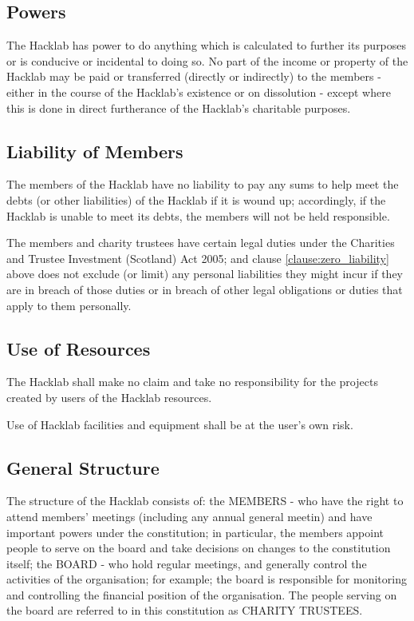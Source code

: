 \documentclass{article}
\newcommand{\charityact}{Charities and Trustee Investment (Scotland) Act 2005}
\begin{document}
\subsection{Powers}
\clause The Hacklab has power to do anything which is calculated to
further its purposes or is conducive or incidental to doing so.
\clause No part of the income or property of the Hacklab may be paid
or transferred (directly or indirectly) to the members - either in the
course of the Hacklab's existence or on dissolution - except where
this is done in direct furtherance of the Hacklab's charitable
purposes.
\subsection{Liability of Members}
\clause\label{clause:zero_liability} The members of the Hacklab have
no liability to pay any sums to help meet the debts (or other
liabilities) of the Hacklab if it is wound up; accordingly, if the
Hacklab is unable to meet its debts, the members will not be held
responsible.

\clause The members and charity trustees have certain legal duties
under the \charityact; and
clause \ref{clause:zero_liability} above does not exclude (or limit)
any personal liabilities they might incur if they are in breach of
those duties or in breach of other legal obligations or duties that
apply to them personally.
\subsection{Use of Resources}

\clause The Hacklab shall make no claim and take no responsibility for
the projects created by users of the Hacklab resources.  

\clause Use of Hacklab facilities and equipment shall be at the user's
own risk.

\subsection{General Structure}
\clause The structure of the Hacklab consists of:
  \subclause the MEMBERS - who have the right to attend members'
  meetings (including any annual general meetin) and have important
  powers under the constitution; in particular, the members appoint
  people to serve on the board and take decisions on changes to the
  constitution itself;
  \subclause the BOARD - who hold regular meetings, and generally
  control the activities of the organisation; for example; the board
  is responsible for monitoring and controlling the financial position
  of the organisation.
\clause The people serving on the board are referred to in this
constitution as CHARITY TRUSTEES.
\end{document}
